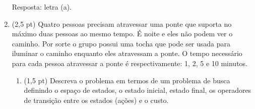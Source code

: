 \documentclass[12pt,a4paper,oneside]{article}
\begin{document}
\begin{enumerate}
{			\vspace*{0.3cm}
			
			Resposta: letra (a).
			
		}	
	
		\newpage
		
		\item (2,5 pt) Quatro pessoas precisam atravessar uma ponte que suporta no máximo duas pessoas ao mesmo tempo. É noite e eles não podem ver o caminho. Por sorte o grupo possui uma tocha que pode ser usada para iluminar o caminho enquanto eles atravessam a ponte. O tempo necessário para cada pessoa atravessar a ponte é respectivamente: 1, 2, 5 e 10 minutos. 
	
	\begin{enumerate}
		\item (1,5 pt) Descreva o problema em termos de um problema de busca definindo o espaço de estados, o estado inicial, estado final, os operadores de transição entre os estados (ações) e o custo.
		
		\vspace*{0.3cm}
		

\end{enumerate}
\end{enumerate}
\end{document}
